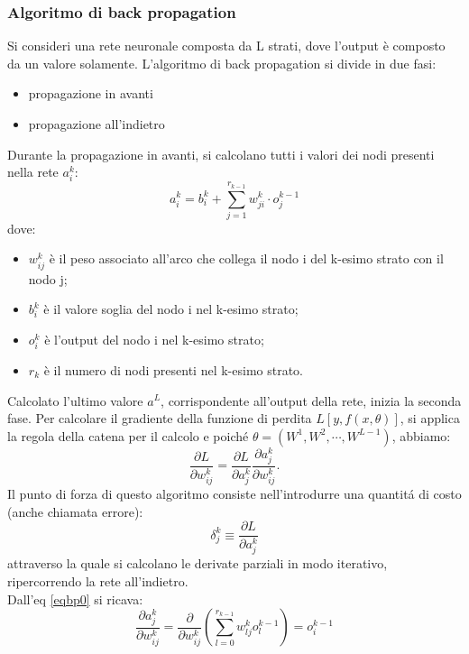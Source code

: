 \documentclass[a4paper,12pt,oneside]{book}
\begin{document}
\subsubsection{Algoritmo di back propagation}\label{back-prop}
Si consideri una rete neuronale composta da L strati, dove l'output \`e composto da un valore solamente.
L'algoritmo di back propagation si divide in due fasi:
\begin{itemize}
\item propagazione in avanti
\item propagazione all'indietro
\end{itemize}
Durante la propagazione in avanti, si calcolano tutti i valori dei nodi presenti nella rete $a_{i}^k$:
\begin{equation}\label{eqbp0}
a_{i}^{k}=b_{i}^{k}+\sum_{j=1}^{r_{k-1}} w_{ji}^{k}\cdot o_{j}^{k-1}
\end{equation}
dove:
\begin{itemize}
\item $w_{ij}^{k}$ \`e il peso associato all'arco che collega il nodo i del k-esimo strato con il nodo j;
\item $b_{i}^{k}$ \`e il valore soglia del nodo i nel k-esimo strato;
\item $o_{i}^{k}$ \`e l'output del nodo i nel k-esimo strato;
\item $r_k$ \`e il numero di nodi presenti nel k-esimo strato.
\end{itemize}
Calcolato l'ultimo valore $a^{L}$, corrispondente all'output della rete, inizia la seconda fase. Per calcolare il gradiente della funzione di perdita $L[y,f(x,\theta)]$, si applica la regola della catena per il calcolo e poich\'{e} $\theta = (W^1,W^2,\cdots ,W^{L-1})$, abbiamo:
\begin{equation}\label{eqbp1}
\frac{\partial L}{\partial w_{ij}^k}=\frac{\partial L}{\partial a_j^k}\frac{\partial a_j^k}{\partial w_{ij}^k}.
\end{equation}
Il punto di forza di questo algoritmo consiste nell'introdurre una quantit\'{a} di costo (anche chiamata errore):
\begin{equation}\label{eqbp2}
\delta_j^k\equiv \frac{\partial L}{\partial a_j^k}
\end{equation}
attraverso la quale si calcolano le derivate parziali in modo iterativo, ripercorrendo la rete all'indietro.\\
Dall'eq \ref{eqbp0} si ricava:
\begin{equation}
\frac{\partial a_j^k}{\partial w_{ij}^k}=\frac{\partial}{\partial w_{ij}^k}\left( \sum_{l=0}^{r_{k-1}}w_{lj}^k o_l^{k-1}\right)=o_i^{k-1}
\end{equation}
\end{document}
